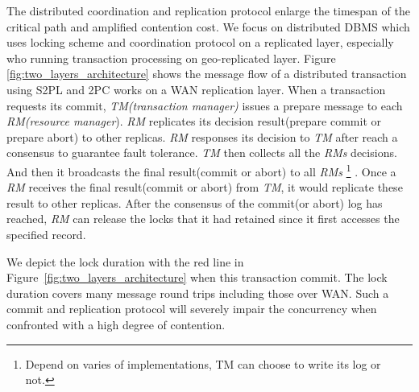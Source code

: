 \documentclass[conference]{IEEEtran}
\begin{document}
The distributed coordination and replication  protocol enlarge the timespan of the critical path and amplified contention cost.
We focus on distributed DBMS which uses locking scheme and coordination protocol on a replicated layer, especially who running transaction processing on geo-replicated layer.
Figure \ref{fig:two_layers_architecture} shows the message flow of a distributed transaction using S2PL and 2PC works on a WAN replication layer.
When a transaction requests its commit, \emph{TM(transaction manager)}  issues a prepare message to each \emph{RM(resource manager}).
\emph{RM} replicates its decision result(prepare commit or prepare abort) to other replicas.
\emph{RM} responses its decision to \emph{TM} after reach a consensus to guarantee fault tolerance. 
\emph{TM} then collects all the \emph{RMs} decisions.
And then it broadcasts the final result(commit or abort) to all \emph{RMs}
\footnote{Depend on varies of implementations, TM can choose to write its log or not.}
.
Once a \emph{RM} receives the final result(commit or abort) from \emph{TM}, it would replicate these result to other replicas.
After the consensus of the commit(or abort) log has reached, \emph{RM} 
can release the locks that it had retained since it first accesses the specified record.

We depict the lock duration with the red line in Figure~\ref{fig:two_layers_architecture} when this transaction commit.
The lock duration covers many message round trips including those over WAN.
Such a commit and replication protocol will severely impair the concurrency when confronted with a high degree of contention.
\end{document}
